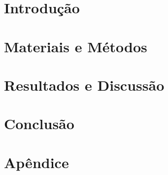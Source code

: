 \documentclass[a4paper,12pt,twoside]{book} %
\begin{document}


\chapter{Introdução}
  
  
  

\chapter{Materiais e Métodos}
  
  
  
  

\chapter{Resultados e Discussão}
  
  
  
  

\chapter{Conclusão}
  
  

\chapter{Apêndice}
  
  
  


\end{document}

